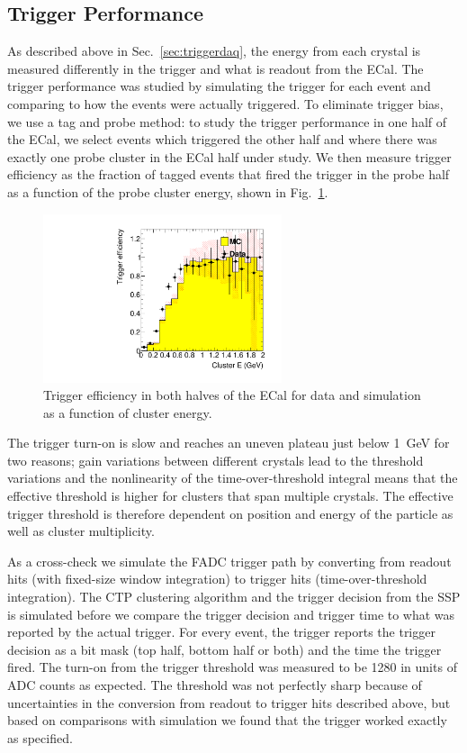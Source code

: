\documentclass[final,3p,times,twocolumn]{elsarticle}
\begin{document}
\subsection{Trigger Performance}
As described above in Sec.~\ref{sec:triggerdaq}, the energy from each 
crystal is measured differently in the trigger and what is readout from the ECal. 
The trigger performance was studied by simulating the 
trigger for each event and comparing to how the events were actually triggered.
To eliminate trigger bias, we use a tag and probe method: to study the trigger performance in one half 
of the ECal, we select 
events which triggered the other half and where there was exactly one probe cluster in the ECal half 
under study. We then measure trigger efficiency as the fraction of tagged events that fired the trigger in 
the probe half as a function of the probe cluster energy, shown in Fig.~\ref{fig:turnon}. 
\begin{figure}[ht]
\begin{center}
{\small
	\includegraphics[width=7cm]{figures/h_cl_E_probedata_eff_h_cl_E_probeMC_eff_dataMC_1351-v7-trig-tagBot.pdf}
	\caption{Trigger efficiency in both halves of the ECal for data and simulation as a 
	function of cluster energy.}
\label{fig:turnon}
}
\end{center}
\end{figure}
The trigger turn-on is slow and reaches an uneven plateau just below 1~GeV for two reasons;  
gain variations between different crystals lead to the threshold variations and the nonlinearity of 
the time-over-threshold integral means that the effective threshold is higher for clusters that span 
multiple crystals. The effective trigger threshold is therefore dependent on position and energy of 
the particle as well as cluster multiplicity. 

As a cross-check we simulate the FADC trigger path by converting from readout hits (with fixed-size 
window integration) to trigger hits (time-over-threshold integration). The CTP clustering 
algorithm and the trigger decision from the SSP is simulated before we compare the trigger decision 
and trigger time to what was reported by the actual trigger. For every event, the trigger reports the 
trigger decision as a bit mask (top half, bottom half or both) and the time the trigger fired.
The turn-on from the trigger threshold was measured to be 1280 in units of ADC counts as expected. 
The threshold was not perfectly sharp because of uncertainties in the conversion from readout to trigger 
hits described above, but based on comparisons with simulation we found that the 
trigger worked exactly as specified.
\end{document}
